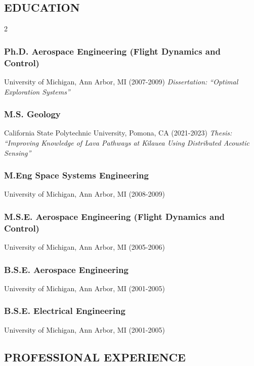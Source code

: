 \documentclass[11pt,letterpaper]{article}
\begin{document}
\subsection*{EDUCATION}
\begin{multicols}{2}
\subsubsection*{Ph.D. Aerospace Engineering (Flight Dynamics and Control)}
University of Michigan, Ann Arbor, MI (2007-2009)
\textit{Dissertation: “Optimal Exploration Systems”}

\subsubsection*{M.S. Geology}
California State Polytechnic University, Pomona, CA (2021-2023)
\textit{Thesis: “Improving Knowledge of Lava Pathways at Kilauea Using Distributed Acoustic Sensing”}

\subsubsection*{M.Eng Space Systems Engineering}
University of Michigan, Ann Arbor, MI (2008-2009)

\subsubsection*{M.S.E. Aerospace Engineering (Flight Dynamics and Control)}
University of Michigan, Ann Arbor, MI (2005-2006)

\subsubsection*{B.S.E. Aerospace Engineering}
University of Michigan, Ann Arbor, MI (2001-2005)

\subsubsection*{B.S.E. Electrical Engineering}
University of Michigan, Ann Arbor, MI (2001-2005)

\end{multicols}
\subsection*{PROFESSIONAL EXPERIENCE}
\end{document}
